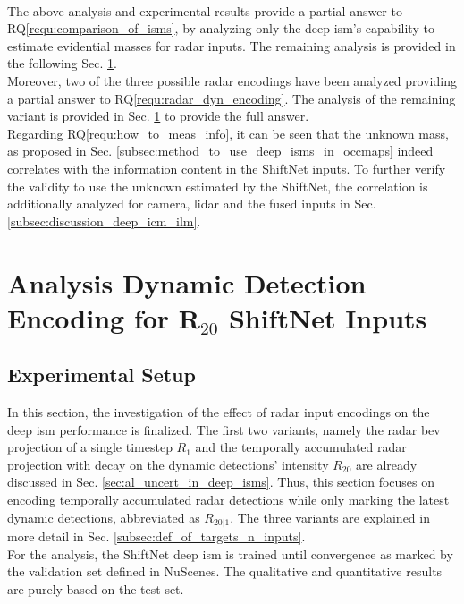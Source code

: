 \\
The above analysis and experimental results provide a partial answer to RQ\ref{requ:comparison_of_isms}, by analyzing only the deep \gls{ism}'s capability to estimate evidential masses for radar inputs. The remaining analysis is provided in the following Sec. \ref{sec:analysis_dyn_encoding}.\\
Moreover, two of the three possible radar encodings have been analyzed providing a partial answer to RQ\ref{requ:radar_dyn_encoding}. The analysis of the remaining variant is provided in Sec. \ref{sec:analysis_dyn_encoding} to provide the full answer.\\
Regarding RQ\ref{requ:how_to_meas_info}, it can be seen that the unknown mass, as proposed in Sec. \ref{subsec:method_to_use_deep_isms_in_occmaps} indeed correlates with the information content in the ShiftNet inputs. To further verify the validity to use the unknown estimated by the ShiftNet, the correlation is additionally analyzed for camera, lidar and the fused inputs in Sec. \ref{subsec:discussion_deep_icm_ilm}.
%
\section{Analysis Dynamic Detection Encoding for R$_{20}$ ShiftNet Inputs}
\label{sec:analysis_dyn_encoding}
%
\subsection{Experimental Setup}
In this section, the investigation of the effect of radar input encodings on the deep \gls{ism} performance is finalized. The first two variants, namely the radar \gls{bev} projection of a single timestep $R_1$ and the temporally accumulated radar projection with decay on the dynamic detections' intensity $R_{20}$ are already discussed in Sec. \ref{sec:al_uncert_in_deep_isms}. Thus, this section focuses on encoding temporally accumulated radar detections while only marking the latest dynamic detections, abbreviated as $R_{20|1}$. The three variants are explained in more detail in Sec. \ref{subsec:def_of_targets_n_inputs}.\\
For the analysis, the ShiftNet deep \gls{ism} is trained until convergence as marked by the validation set defined in NuScenes. The qualitative and quantitative results are purely based on the test set.
%
